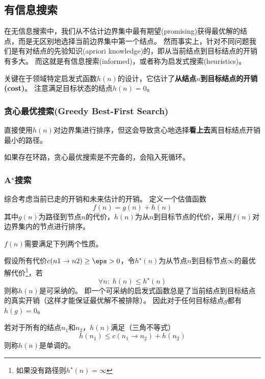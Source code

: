 
\subsection{有信息搜索}
在无信息搜索中，我们从不估计边界集中最有期望(promising)获得最优解的结点，而是无区别地选择当前边界集中第一个结点。
然而事实上，针对不同问题我们是有对结点的先验知识(apriori knowledge)的，即从当前结点到目标结点的开销有多大。
而这就是有信息搜索(informed)，或者称为启发式搜索(heuristics)。

关键在于领域特定启发式函数$h(n)$的设计，它估计了\textbf{从结点$n$到目标结点的开销(cost)}。
注意满足目标状态的结点$h(n)=0$。

\subsubsection{贪心最优搜索(Greedy Best-First Search)}
直接使用$h(n)$对边界集进行排序，但这会导致贪心地选择\textbf{看上去}离目标结点开销最小的路径。

如果存在环路，贪心最优搜索是不完备的，会陷入死循环。
\begin{center}
\end{center}

\subsubsection{A$^\star$搜索}
综合考虑当前已走的开销和未来估计的开销。
定义一个估值函数
\[f(n)=g(n)+h(n)\]
其中$g(n)$为路径到节点$n$的代价，$h(n)$为从$n$到目标节点的代价，采用$f(n)$对边界集内的节点进行排序。

$f(n)$需要满足下列两个性质。
\begin{definition}
假设所有代价$c(n1\to n2)\geq\eps>0$，令$h^\star(n)$为从节点$n$到目标节点$\infty$的最优解代价\footnote{如果没有路径则$h^\star(n)=\infty$}，若
\[\forall n:\;h(n)\leq h^\star(n)\]
则称$h(n)$是可采纳的。
即一个可采纳的启发式函数总是了当前结点到目标结点的真实开销（这样才能保证最优解不被排除）。
因此对于任何目标结点$g$都有$h(g)=0$。
\end{definition}
\begin{definition}
若对于所有的结点$n_1$和$n_2$，$h(n)$满足（三角不等式）
\[h(n_1)\leq c(n_1\to n_2)+h(n_2)\]
则称$h(n)$是单调的。
\end{definition}

